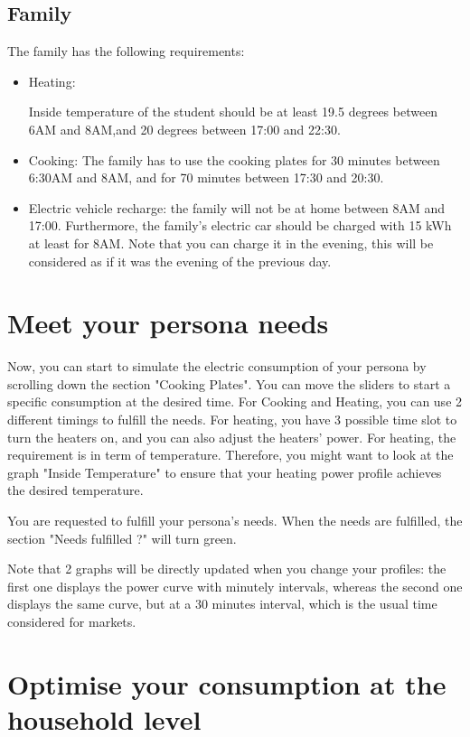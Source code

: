 \documentclass[a4paper, chapterprefix=true, openany]{scrbook}
\begin{document}
	\subsection{Family}
	The family has the following requirements:
	\begin{itemize}
		\item Heating:
		
		Inside temperature of the student should be at least 19.5 degrees between 6AM and 8AM,and 20 degrees between 17:00 and 22:30. 
		
		\item Cooking:
		The family has to use the cooking plates for 30 minutes between 6:30AM and 8AM, and for 70 minutes between 17:30 and 20:30.
		
		\item Electric vehicle recharge: the family will not be at home between 8AM and 17:00. Furthermore, the family's electric car should be charged with 15 kWh at least for 8AM. Note that you can charge it in the evening, this will be considered as if it was the evening of the previous day.
	\end{itemize}
	
	\section{Meet your persona needs}
	
Now, you can start to simulate the electric consumption of your persona by scrolling down the section "Cooking Plates".
You can move the sliders to start a specific consumption at the desired time. For Cooking and Heating, you can use 2 different timings to fulfill the needs.
For heating, you have 3 possible time slot to turn the heaters on, and you can also adjust the heaters' power. For heating, the requirement is in term of temperature. Therefore, you might want to look at the graph "Inside Temperature" to ensure that your heating power profile achieves the desired temperature.

You are requested to fulfill your persona's needs. When the needs are fulfilled, the section "Needs fulfilled ?" will turn green.


Note that 2 graphs will be directly updated when you change your profiles: the first one displays the power curve with minutely intervals, whereas the second one displays the same curve, but at a 30 minutes interval, which is the usual time considered for markets.

	\section{Optimise your consumption at the household level}
\end{document}

